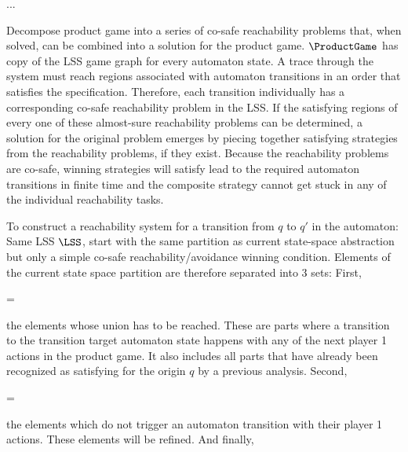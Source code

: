 ...

\startsubsection[title={Decomposition}]

    Decompose product game into a series of co-safe reachability problems that, when solved, can be combined into a solution for the product game.
    $\ProductGame$ has copy of the LSS game graph for every automaton state.
    A trace through the system must reach regions associated with automaton transitions in an order that satisfies the specification.
    Therefore, each transition individually has a corresponding co-safe reachability problem in the LSS.
    If the satisfying regions of every one of these almost-sure reachability problems can be determined, a solution for the original problem emerges by piecing together satisfying strategies from the reachability problems, if they exist.
    Because the reachability problems are co-safe, winning strategies will satisfy lead to the required automaton transitions in finite time and the composite strategy cannot get stuck in any of the individual reachability tasks.

    To construct a reachability system for a transition from $q$ to $q'$ in the automaton:
    Same LSS $\LSS$, start with the same partition as current state-space abstraction but only a simple co-safe reachability/avoidance winning condition.
    Elements of the current state space partition are therefore separated into 3 sets:
    First,

    \startformula
         =  \EndComma
    \stopformula

    the elements whose union has to be reached.
    These are parts where a transition to the transition target automaton state happens with any of the next player 1 actions in the product game.
    It also includes all parts that have already been recognized as satisfying for the origin $q$ by a previous analysis.
    Second,

    \startformula
         =  \EndComma
    \stopformula

    the elements which do not trigger an automaton transition with their player 1 actions.
    These elements will be refined.
    And finally,

